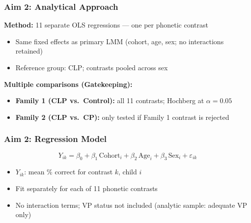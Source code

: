 \documentclass{beamer}
\begin{document}
\begin{frame}
\frametitle{Aim 2: Analytical Approach}
\textbf{Method:} 11 separate OLS regressions --- one per phonetic contrast
\begin{itemize}
  \item Same fixed effects as primary LMM (cohort, age, sex; no interactions retained)
  \item Reference group: CLP; contrasts pooled across sex
\end{itemize}
\vspace{0.4em}
\textbf{Multiple comparisons (Gatekeeping):}
\begin{itemize}
  \item \textbf{Family 1 (CLP vs.\ Control):} all 11 contrasts; Hochberg at $\alpha = 0.05$
  \item \textbf{Family 2 (CLP vs.\ CP):} only tested if Family 1 contrast is rejected
\end{itemize}
\end{frame}
\begin{frame}
\frametitle{Aim 2: Regression Model}
\[
Y_{ik} =
\beta_0 +
\beta_1\,\text{Cohort}_i +
\beta_2\,\text{Age}_i +
\beta_3\,\text{Sex}_i +
\varepsilon_{ik}
\]
\begin{itemize}
  \item $Y_{ik}$: mean \% correct for contrast $k$, child $i$
  \item Fit separately for each of 11 phonetic contrasts
  \item No interaction terms; VP status not included (analytic sample: adequate VP only)
\end{itemize}
\end{frame}
\end{document}
